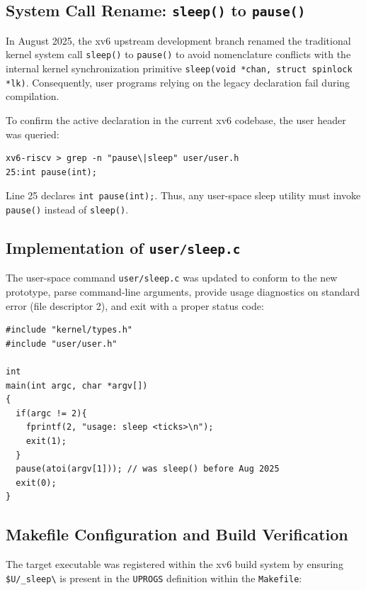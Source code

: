 \documentclass[12pt,a4paper]{article}
\begin{document}
\subsection{System Call Rename: \texttt{sleep()} to \texttt{pause()}}
In August 2025, the xv6 upstream development branch renamed the traditional kernel system call \texttt{sleep()} to \texttt{pause()} to avoid nomenclature conflicts with the internal kernel synchronization primitive \texttt{sleep(void *chan, struct spinlock *lk)}. Consequently, user programs relying on the legacy declaration fail during compilation.

To confirm the active declaration in the current xv6 codebase, the user header was queried:
\begin{lstlisting}[style=consolestyle, caption={Searching for pause/sleep system call prototype in user/user.h}]
xv6-riscv > grep -n "pause\|sleep" user/user.h
25:int pause(int);
\end{lstlisting}

Line 25 declares \texttt{int pause(int);}. Thus, any user-space sleep utility must invoke \texttt{pause()} instead of \texttt{sleep()}.

\subsection{Implementation of \texttt{user/sleep.c}}
The user-space command \texttt{user/sleep.c} was updated to conform to the new prototype, parse command-line arguments, provide usage diagnostics on standard error (file descriptor 2), and exit with a proper status code:

\begin{lstlisting}[style=cstyle, caption={Implementation of user/sleep.c for xv6}]
#include "kernel/types.h"
#include "user/user.h"

int
main(int argc, char *argv[])
{
  if(argc != 2){
    fprintf(2, "usage: sleep <ticks>\n");
    exit(1);
  }
  pause(atoi(argv[1])); // was sleep() before Aug 2025
  exit(0);
}
\end{lstlisting}

\subsection{Makefile Configuration and Build Verification}
The target executable was registered within the xv6 build system by ensuring \texttt{\$U/\_sleep\textbackslash} is present in the \texttt{UPROGS} definition within the \texttt{Makefile}:
\end{document}
